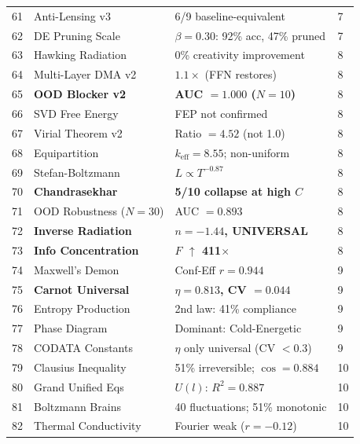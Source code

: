 \documentclass[11pt,a4paper]{article}
\begin{document}
\begin{center}
\begin{longtable}{@{}clll@{}}
61 & Anti-Lensing v3            & 6/9 baseline-equivalent                  & 7 \\
62 & DE Pruning Scale           & $\beta = 0.30$: 92\% acc, 47\% pruned   & 7 \\
\midrule
63 & Hawking Radiation          & 0\% creativity improvement               & 8 \\
64 & Multi-Layer DMA v2         & $1.1\times$ (FFN restores)               & 8 \\
65 & \textbf{OOD Blocker v2}    & \textbf{AUC $= 1.000$ ($N=10$)}         & 8 \\
66 & SVD Free Energy            & FEP not confirmed                        & 8 \\
67 & Virial Theorem v2          & Ratio $= 4.52$ (not 1.0)                & 8 \\
68 & Equipartition              & $k_{\text{eff}} = 8.55$; non-uniform     & 8 \\
69 & Stefan-Boltzmann           & $L \propto T^{-0.87}$                    & 8 \\
70 & \textbf{Chandrasekhar}     & \textbf{5/10 collapse at high $C$}       & 8 \\
71 & OOD Robustness ($N=30$)    & AUC $= 0.893$                            & 8 \\
72 & \textbf{Inverse Radiation} & \textbf{$n = -1.44$, UNIVERSAL}          & 8 \\
73 & \textbf{Info Concentration}& \textbf{$F$ $\uparrow$ 411$\times$}      & 8 \\
\midrule
74 & Maxwell's Demon            & Conf-Eff $r = 0.944$                     & 9 \\
75 & \textbf{Carnot Universal}  & \textbf{$\eta = 0.813$, CV $= 0.044$}   & 9 \\
76 & Entropy Production         & 2nd law: 41\% compliance                 & 9 \\
77 & Phase Diagram              & Dominant: Cold-Energetic                 & 9 \\
78 & CODATA Constants           & $\eta$ only universal (CV $< 0.3$)       & 9 \\
\midrule
79 & Clausius Inequality        & 51\% irreversible; $\cos = 0.884$        & 10 \\
80 & Grand Unified Eqs          & $U(l)$: $R^2 = 0.887$                   & 10 \\
81 & Boltzmann Brains           & 40 fluctuations; 51\% monotonic          & 10 \\
82 & Thermal Conductivity       & Fourier weak ($r = -0.12$)               & 10 \\

\end{longtable}
\end{center}
\end{document}
